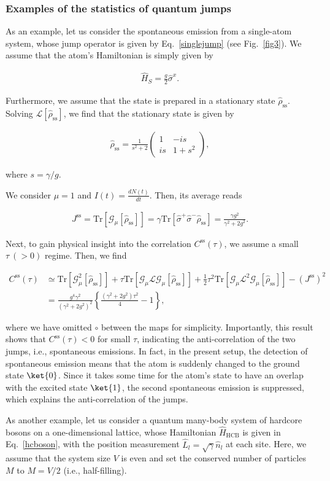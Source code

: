 \documentclass[preprint,pteplogo]{ptephy_v2}%
\numberwithin{equation}{section}
\theoremstyle{definition}
\newcommand{\ml}[1]{\mathcal{#1}}
\newcommand{\mr}[1]{\mathrm{#1}}
\newcommand{\lrm}[1]{{\left\{ #1 \right\}}}
\newcommand{\aln}[1]{
\begin{align}
#1
\end{align}
}
\newcommand{\pmat}[1]{
\begin{pmatrix}
#1
\end{pmatrix}
}
\newcommand{\Tr}{\mr{Tr}}
\begin{document}
\subsubsection{Examples of the statistics of quantum jumps}
As an example, let us consider the spontaneous emission from a single-atom system, whose jump operator is given by Eq.~\eqref{singlejump} (see Fig.~\ref{fig3}).
We assume that the atom's Hamiltonian is simply given by 
\aln{
\hat{H}_S=\frac{g}{2}\hat{\sigma}^x.
}
Furthermore, we assume that the state is prepared in a stationary state $\hat{\rho}_\mr{ss}$.
Solving $\ml{L}[\hat{\rho}_\mr{ss}]$, we find that the stationary state is given by
\aln{
\hat{\rho}_\mr{ss}=\frac{1}{s^2+2}\pmat{1 & -is\\ is & 1+s^2},
}
where $s=\gamma/g$.

We consider $\mu=1$ and ${I}(t)=\frac{dN(t)}{dt}$. Then, its average reads
\aln{
J^\mr{ss}=\Tr[\ml{G}_\mu[\hat{\rho}_\mr{ss}]]=\gamma\Tr[\hat{\sigma}^+\hat{\sigma}^-\hat{\rho}_\mr{ss}]=\frac{\gamma g^2}{\gamma^2+2g^2}.
}
Next, to gain physical insight into the correlation $C^\mr{ss}(\tau)$, we assume a small $\tau\:(>0)$ regime.
Then, we find
\aln{
C^\mr{ss}(\tau)&\simeq\Tr[\ml{G}_\mu^2[\hat{\rho}_\mr{ss}]]+\tau\Tr[\ml{G}_\mu\ml{L}\ml{G}_\mu[\hat{\rho}_\mr{ss}]]+\frac{1}{2}\tau^2\Tr[\ml{G}_\mu\ml{L}^2\ml{G}_\mu[\hat{\rho}_\mr{ss}]]-(J^\mr{ss})^2\nonumber\\
&=\frac{g^4\gamma^2}{(\gamma^2+2g^2)^2}\lrm{\frac{(\gamma^2+2g^2)\tau^2}{4}-1},
}
where we have omitted $\circ$ between the maps for simplicity.
Importantly, this result shows that $C^\mr{ss}(\tau)<0$ for small $\tau$, indicating the anti-correlation of the two jumps, i.e., spontaneous emissions.
In fact, in the present setup, the detection of spontaneous emission means that the atom is suddenly changed to the ground state $\ket{0}$. 
Since it takes some time for the atom's state to have an overlap with the excited state $\ket{1}$, the second spontaneous emission is suppressed, which explains the anti-correlation of the jumps.

As another example, let us consider a quantum many-body system of hardcore bosons on a one-dimensional lattice, whose Hamiltonian $\hat{H}_\mr{HCB}$ is  given in Eq.~\eqref{hcboson},
with the position measurement $\hat{L}_l=\sqrt{\gamma}\hat{n}_l$ at each site.
Here, we assume that the system size $V$ is even and set the conserved number of particles $M$ to $M=V/2$ (i.e., half-filling).
\end{document}

